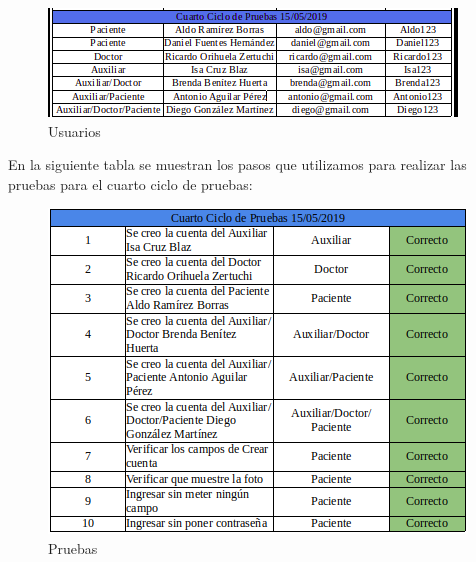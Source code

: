 \begin{figure}[!htbp]			
	\hypertarget{fig:usuarios4}{\hspace{1pt}}
	\begin{center}
		\includegraphics[height=0.17\textheight]{Pruebas/images/Usuarios4}
		\caption{Usuarios}
		\label{fig:usuarios4}
	\end{center}
\end{figure}


En la siguiente tabla se muestran los pasos que utilizamos para realizar las pruebas para el cuarto ciclo de pruebas:
\newpage

\begin{figure}[!htbp]			
	\hypertarget{fig:Pruebas4}{\hspace{1pt}}
	\begin{center}
		\includegraphics[height=0.35\textheight]{Pruebas/images/pcc1}
		\caption{Pruebas}
		\label{fig:Pruebas4}
	\end{center}
\end{figure}

